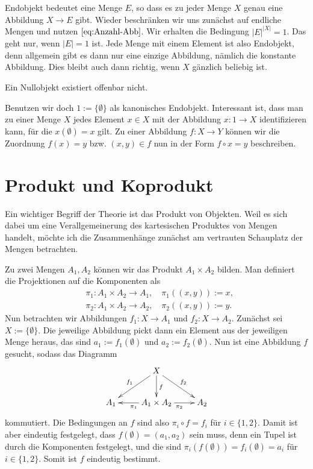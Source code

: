 Endobjekt bedeutet eine Menge $E$, so dass es zu jeder Menge $X$
genau eine Abbildung $X\to E$ gibt. Wieder beschränken wir uns
zunächst auf endliche Mengen und nutzen $\eqref{eq:Anzahl-Abb}$.
Wir erhalten die Bedingung $|E|^{|X|}=1$. Das geht nur, wenn
$|E|=1$ ist. Jede Menge mit einem Element ist also Endobjekt,
denn allgemein gibt es dann nur eine einzige Abbildung, nämlich
die konstante Abbildung. Dies bleibt auch dann richtig, wenn
$X$ gänzlich beliebig ist.

Ein Nullobjekt existiert offenbar nicht.

Benutzen wir doch $1:=\{\emptyset\}$ als kanonisches Endobjekt.
Interessant ist, dass man zu einer Menge $X$ jedes Element
$x\in X$ mit der Abbildung $x\colon 1\to X$ identifizieren kann,
für die $x(\emptyset)=x$ gilt. Zu einer Abbildung $f\colon X\to Y$
können wir die Zuordnung $f(x)=y$ bzw. $(x,y)\in f$ nun in der Form
$f\circ x = y$ beschreiben.

\section{Produkt und Koprodukt}

Ein wichtiger Begriff der Theorie ist das Produkt von
Objekten. Weil es sich dabei um eine Verallgemeinerung des
kartesischen Produktes von Mengen handelt, möchte ich die
Zusammenhänge zunächst am vertrauten Schauplatz der Mengen
betrachten.

Zu zwei Mengen $A_1, A_2$ können wir das Produkt
$A_1\times A_2$ bilden. Man definiert die Projektionen
auf die Komponenten als
\begin{align*}
&\pi_1\colon A_1\times A_2\to A_1,\quad\pi_1((x,y)) := x,\\
&\pi_2\colon A_1\times A_2\to A_2,\quad\pi_2((x,y)) := y.
\end{align*}
Nun betrachten wir Abbildungen $f_1\colon X\to A_1$ und
$f_2\colon X\to A_2$. Zunächst sei $X:=\{\emptyset\}$. Die jeweilige
Abbildung pickt dann ein Element aus der jeweiligen Menge heraus,
das sind $a_1:=f_1(\emptyset)$ und $a_2:=f_2(\emptyset)$. Nun
ist eine Abbildung $f$ gesucht, sodass das Diagramm
\[\xymatrix{
& X\ar[dl]_{f_1}\ar[dr]^{f_2}\ar[d]^f & \\
A_1 & A_1\times A_2 \ar[l]^{\pi_1}\ar[r]_{\pi_2} & A_2
}\]
kommutiert. Die Bedingungen an $f$ sind also
$\pi_i\circ f = f_i$ für $i\in\{1,2\}$. Damit ist aber eindeutig
festgelegt, dass $f(\emptyset)=(a_1,a_2)$ sein muss, denn ein
Tupel ist durch die Komponenten festgelegt, und die sind
$\pi_i(f(\emptyset)) = f_i(\emptyset) = a_i$ für $i\in\{1,2\}$.
Somit ist $f$ eindeutig bestimmt.

